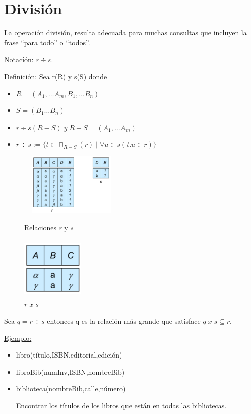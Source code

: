 \documentclass[12pt,a4paper]{report}
\begin{document}
	\section{División}
		\par La operación división, resulta adecuada para muchas consultas que incluyen la frase “para todo” o “todos”.
		\vspace{5mm}
		\par \underline{Notación:} $r \div s$.
		\vspace{3mm}
		\par Definición: Sea r(R) y s(S) donde
		\begin{itemize}
			\item $R = (A_{1}, \dotsc A_{m}, B_{1}, \dotsc B_{n})$
			\item $S = (B_{1} \dotsc B_{n})$
			\item $r \div s(R - S) \; y \; R - S = (A_{1}, \dotsc A_{m})$
			\item $r \div s := \lbrace t \in \sqcap_{R-S}(r) \; | \; \forall u \in s (t.u \in r) \rbrace$
		\end{itemize}

		\begin{figure}[htb]
				\centering
				\includegraphics[width=5cm, height=3cm]{./imagenes/div1.png}
				\caption{Relaciones \textit{r} y \textit{s}}
				\vspace{5mm}
				\includegraphics[width=3cm, height=3cm]{./imagenes/div2.png}
				\caption{$r \; x \; s$}
		\end{figure}
		
		\par Sea $q = r \div s$ entonces q es la relación más grande que satisface $q \; x \; s \subseteq r$.

		\vspace{5mm}
		\underline{Ejemplo:}
		\begin{itemize}
			\item libro(título,ISBN,editorial,edición)
			\item libroBib(numInv,ISBN,nombreBib)
			\item biblioteca(nombreBib,calle,número)
			\par Encontrar los títulos de los libros que están en todas las bibliotecas.
		\end{itemize}
 
\end{document}
